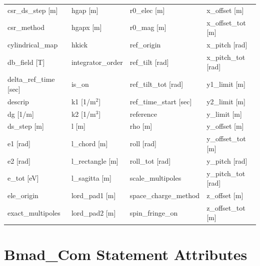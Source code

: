 \begin{tabular}{llll}
csr_ds_step [m]                  & hgap [m]                         & r0_elec [m]                      & x_offset [m]                     \\
csr_method                       & hgapx [m]                        & r0_mag [m]                       & x_offset_tot [m]                 \\
cylindrical_map                  & hkick                            & ref_origin                       & x_pitch [rad]                    \\
db_field [T]                     & integrator_order                 & ref_tilt [rad]                   & x_pitch_tot [rad]                \\
delta_ref_time [sec]             & is_on                            & ref_tilt_tot [rad]               & y1_limit [m]                     \\
descrip                          & k1 [1/m$^2$]                     & ref_time_start [sec]             & y2_limit [m]                     \\
dg [1/m]                         & k2 [1/m$^3$]                     & reference                        & y_limit [m]                      \\
ds_step [m]                      & l [m]                            & rho [m]                          & y_offset [m]                     \\
e1 [rad]                         & l_chord [m]                      & roll [rad]                       & y_offset_tot [m]                 \\
e2 [rad]                         & l_rectangle [m]                  & roll_tot [rad]                   & y_pitch [rad]                    \\
e_tot [eV]                       & l_sagitta [m]                    & scale_multipoles                 & y_pitch_tot [rad]                \\
ele_origin                       & lord_pad1 [m]                    & space_charge_method              & z_offset [m]                     \\
exact_multipoles                 & lord_pad2 [m]                    & spin_fringe_on                   & z_offset_tot [m]                 \\
 \bottomrule
 \end{tabular}
 \vfill
 
 \section{Bmad_Com Statement Attributes}
 \label{s:list.bmad.com}
 
